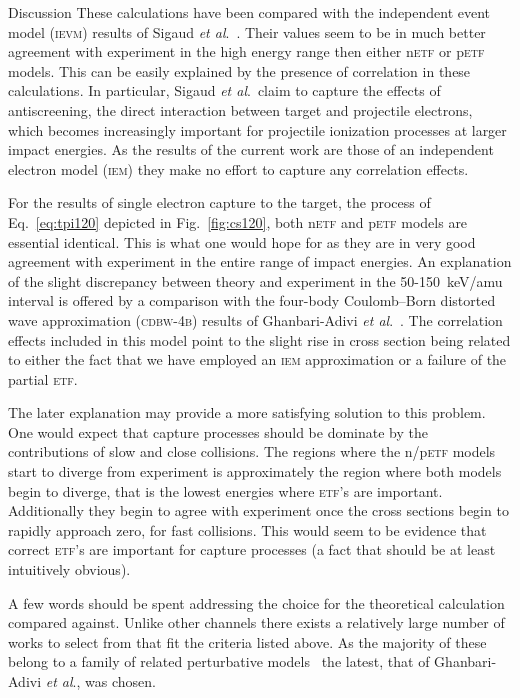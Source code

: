 \documentclass[aps, pra, reprint, groupedaddress, amsfonts,
               amsmath, amssymb, showpacs, nofootinbib]{revtex4-1}
\begin{document}
\begin{section}{Discussion \label{sec:disc}}
   These calculations have been compared with the independent event model (\textsc{ievm}) results of
   Sigaud \textit{et al}.~\cite{SM-03}. Their values seem to be in much better agreement with experiment
   in the high energy range then either n\textsc{etf} or p\textsc{etf} models. This can be easily
   explained by the presence of correlation in these calculations. In particular, Sigaud
   \textit{et al}.\ claim to capture the effects of antiscreening, the direct interaction between
   target and projectile electrons, which becomes increasingly important for projectile ionization
   processes at larger impact energies. As the results of the current work are those of an independent
   electron model (\textsc{iem}) they make no effort to capture any correlation effects.

   For the results of single electron capture to the target, the process of Eq.~\eqref{eq:tpi120}
   depicted in Fig.~\ref{fig:cs120}, both n\textsc{etf} and p\textsc{etf} models are essential
   identical. This is what one would hope for as they are in very good agreement with experiment in the
   entire range of impact energies. An explanation of the slight discrepancy between theory and
   experiment in the 50-150~keV/amu interval is offered by a comparison with the four-body Coulomb–Born
   distorted wave approximation (\textsc{cdbw-4b}) results of Ghanbari-Adivi
   \textit{et al}.~\cite{GAG15}. The correlation effects included in this model point to the slight rise
   in cross section being related to either the fact that we have employed an \textsc{iem} approximation
   or a failure of the partial \textsc{etf}.

   The later explanation may provide a more satisfying solution to this problem. One would expect that
   capture processes should be dominate by the contributions of slow and close collisions. The regions
   where the n/p\textsc{etf} models start to diverge from experiment is approximately the region where
   both models begin to diverge, that is the lowest energies where \textsc{etf}'s are important.
   Additionally they begin to agree with experiment once the cross sections begin to rapidly approach
   zero, for fast collisions. This would seem to be evidence that correct \textsc{etf}'s are important
   for capture processes (a fact that should be at least intuitively obvious).

   A few words should be spent addressing the choice for the theoretical calculation compared against.
   Unlike other channels there exists a relatively large number of works to select from that fit the
   criteria listed above. As the majority of these belong to a family of related perturbative
   models~\cite{Mancev96, BOC05, Mancev-07, MG-10, NTC11, GG-12b, GAG15} the latest, that of
   Ghanbari-Adivi \textit{et al}., was chosen.


\end{section}
\end{document}
